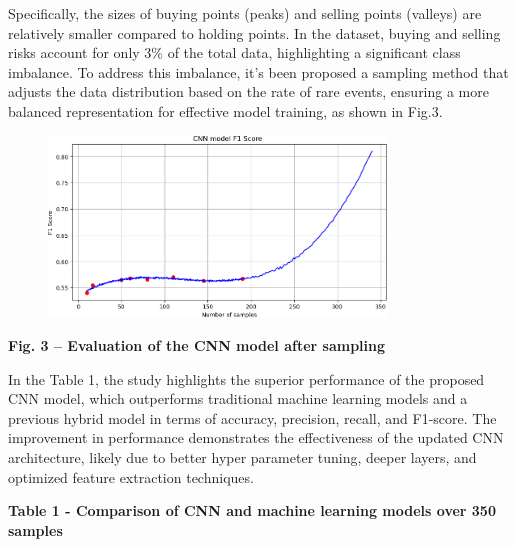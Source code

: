 {Specifically, the sizes of buying points (peaks) and selling points
(valleys) are relatively smaller compared to holding points. In the
dataset, buying and selling risks account for only 3\% of the total
data, highlighting a significant class imbalance. To address this
imbalance, it's been proposed a sampling method that adjusts the data
distribution based on the rate of rare events, ensuring a more balanced
representation for effective model training, as shown in Fig.3.

\begin{figure}[H]
	\centering
	\includegraphics[width=0.8\textwidth]{media/ict2/image11}
	\caption*{}
\end{figure}


{\bfseries Fig. 3 -- Evaluation of the CNN model after sampling}

In the Table 1, the study highlights the superior performance of the
proposed CNN model, which outperforms traditional machine learning
models and a previous hybrid model in terms of accuracy, precision,
recall, and F1-score. The improvement in performance demonstrates the
effectiveness of the updated CNN architecture, likely due to better
hyper parameter tuning, deeper layers, and optimized feature extraction
techniques.

{\bfseries Table 1 - Comparison of CNN and machine learning models over 350
samples}

}
